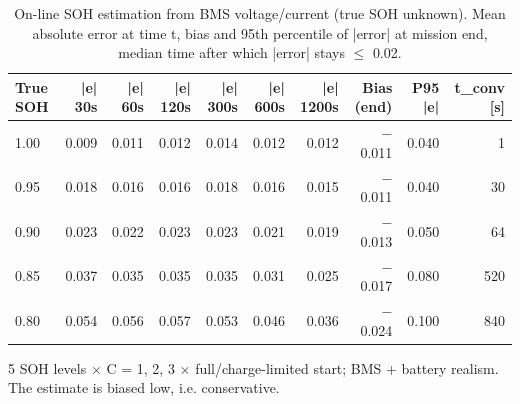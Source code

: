\begin{table}[t]
\centering
\caption{On-line SOH estimation from BMS voltage/current (true SOH unknown). Mean absolute error at time t, bias and 95th percentile of |error| at mission end, median time after which |error| stays $\leq$ 0.02.}
\label{tab:soh_est}
\footnotesize
\setlength{\tabcolsep}{4pt}
\begin{tabular}{lrrrrrrrrr}
\toprule
True SOH & |e| 30s & |e| 60s & |e| 120s & |e| 300s & |e| 600s & |e| 1200s & Bias (end) & P95 |e| & t\_conv [s] \\
\midrule
1.00 & 0.009 & 0.011 & 0.012 & 0.014 & 0.012 & 0.012 & $-$0.011 & 0.040 & 1 \\
0.95 & 0.018 & 0.016 & 0.016 & 0.018 & 0.016 & 0.015 & $-$0.011 & 0.040 & 30 \\
0.90 & 0.023 & 0.022 & 0.023 & 0.023 & 0.021 & 0.019 & $-$0.013 & 0.050 & 64 \\
0.85 & 0.037 & 0.035 & 0.035 & 0.035 & 0.031 & 0.025 & $-$0.017 & 0.080 & 520 \\
0.80 & 0.054 & 0.056 & 0.057 & 0.053 & 0.046 & 0.036 & $-$0.024 & 0.100 & 840 \\
\bottomrule
\end{tabular}
\par\vspace{2pt}\parbox{\linewidth}{\scriptsize 5 SOH levels $\times$ C = 1, 2, 3 $\times$ full/charge-limited start; BMS + battery realism. The estimate is biased low, i.e. conservative.}
\end{table}
